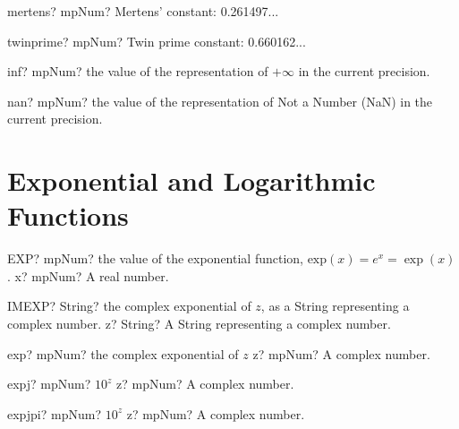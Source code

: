 \documentclass[12pt,a4paper,openany]{book}
\begin{document}
\begin{mpFunctionsExtract}
\mpFunctionZero
{mertens? mpNum?  Mertens' constant: 0.261497...}
\end{mpFunctionsExtract}

\begin{mpFunctionsExtract}
\mpFunctionZero
{twinprime? mpNum?  Twin prime constant: 0.660162...}
\end{mpFunctionsExtract}

\begin{mpFunctionsExtract}
\mpFunctionZero
{inf? mpNum? the value of the representation of  $+\infty$ in the current precision.}
\end{mpFunctionsExtract}

\begin{mpFunctionsExtract}
\mpFunctionZero
{nan? mpNum? the value of the representation of Not a Number (NaN) in the current precision.}
\end{mpFunctionsExtract}

\section{Exponential and Logarithmic Functions}

\begin{mpFunctionsExtract}
\mpWorksheetFunctionOneNotImplemented
{EXP? mpNum? the value of the exponential function, $\text{exp}(x) = e^x = \exp(x)$.}
{x? mpNum? A real number.}
\end{mpFunctionsExtract}

\begin{mpFunctionsExtract}
\mpWorksheetFunctionOneNotImplemented
{IMEXP? String? the complex exponential of $z$, as a String representing a complex number.}
{z? String? A String representing a complex number.}
\end{mpFunctionsExtract}

\begin{mpFunctionsExtract}
\mpFunctionOne
{exp? mpNum? the complex exponential of $z$}
{z? mpNum? A complex number.}
\end{mpFunctionsExtract}

\begin{mpFunctionsExtract}
\mpFunctionOne
{expj? mpNum?  $10^z$}
{z? mpNum? A complex number.}
\end{mpFunctionsExtract}

\begin{mpFunctionsExtract}
\mpFunctionOne
{expjpi? mpNum?  $10^z$}
{z? mpNum? A complex number.}
\end{mpFunctionsExtract}
\end{document}
